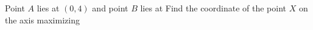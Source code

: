 Point $ A$ lies at $ (0, 4)$ and point $ B$ lies at   Find the coordinate of the point $ X$ on the axis maximizing 